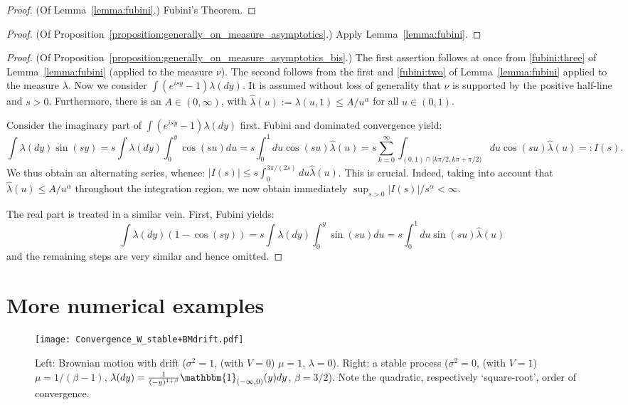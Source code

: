 \documentclass[pdftex,oneside,11pt,reqno]{amsart}
\theoremstyle{definition}
\theoremstyle{theorem}
\theoremstyle{remark}
\numberwithin{equation}{section}
\numberwithin{definition}{section}
\begin{document}
\begin{proof}(Of Lemma~\ref{lemma:fubini}.)
Fubini's Theorem.
\end{proof}

\begin{proof}(Of Proposition~\ref{proposition:generally_on_measure_asymptotics}.)
Apply Lemma~\ref{lemma:fubini}.
\end{proof}

\begin{proof}(Of Proposition~\ref{proposition:generally_on_measure_asymptotics_bis}.)
The first assertion follows at once from \ref{fubini:three} of Lemma~\ref{lemma:fubini} (applied to the measure $\nu$). The second follows from the first and \ref{fubini:two} of Lemma~\ref{lemma:fubini} applied to the measure $\lambda$. Now we consider $\int (e^{isy}-1)\lambda(dy)$. It is assumed without loss of generality that $\nu$ is supported by the positive half-line and $s>0$. Furthermore, there is an $A\in (0,\infty)$, with $\hat{\lambda}(u):=\lambda(u,1)\leq A/u^\alpha$ for all $u\in (0,1)$.

Consider the imaginary part of $\int (e^{isy}-1)\lambda(dy)$ first. Fubini and dominated convergence yield: 
\footnotesize 
$$\int \lambda(dy)\sin(sy)=s\int \lambda(dy)\int_0^y\cos(su)du=s\int_0^1du\cos(su)\hat{\lambda}(u)=s\sum_{k=0}^\infty \int_{(0,1)\cap [k\pi/2,k\pi+\pi/2)}du\cos(su)\hat{\lambda}(u)=:I(s).$$ 
\normalsize
We thus obtain an alternating series, whence: $\vert I(s)\vert\leq s \int_0^{3\pi/(2s)}du\hat{\lambda}(u)$. This is crucial. Indeed, taking into account that $\hat{\lambda}(u)\leq A/u^\alpha$ throughout the integration region, we now obtain immediately  $\sup_{s>0}\vert I(s)\vert /s^\alpha<\infty$.

The real part is treated in a similar vein. First, Fubini yields: $$\int \lambda(dy)(1-\cos(sy))=s\int \lambda(dy)\int_0^y\sin(su)du=s\int_0^1du\sin(su)\hat{\lambda}(u)$$ and the remaining steps are very similar and hence omitted. 
\end{proof}

\section{More numerical examples}\label{appendix:further_examples}

\begin{figure}[!htb]
\texttt{[image: Convergence\_W\_stable+BMdrift.pdf]}
\caption{Left: Brownian motion with drift (${\sigma^2}=1$, (with $V=0$) $\mu=1$, ${\lambda}=0$). Right: a stable process (${\sigma^2}=0$, (with $V=1$) $\mu=1/(\beta-1)$, ${\lambda}(dy)=\frac{1}{(-y)^{1+\beta }}\mathbbm{1}_{(-\infty,0)}(y)dy$, $\beta=3/2$). Note the quadratic, respectively `square-root', order of convergence.}
\label{fig:W_convergence_BM_drift}
\end{figure}
\end{document}
